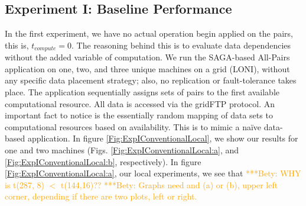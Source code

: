 \documentclass{rspublic}
\newcommand{\betynote}[1]{ {\textcolor{orange} { ***Bety: #1 }}}
\begin{document}
\subsection{Experiment I: Baseline Performance}
 In the first experiment, we have no actual operation begin applied on
the pairs, this is, $t_{compute}=0$. The reasoning behind this is to
evaluate data dependencies without the added variable of computation.
We run the SAGA-based All-Pairs application on one, two, and three
unique machines on a grid (LONI), without any specific data placement
strategy; also, no replication or fault-tolerance takes place. The
application sequentially assigns sets of pairs to the first available
computational resource. All data is accessed via the gridFTP protocol.
An important fact to notice is the essentially random mapping of data
sets to computational resources based on availability. This is to mimic
a naïve data-based application. In figure
\ref{Fig:ExpIConventionalLocal}, we show our results for one and two
machines (Figs. \ref{Fig:ExpIConventionalLocal:a}, and
\ref{Fig:ExpIConventionalLocal:b}, respectively). In figure
\ref{Fig:ExpIConventionalLocal:a}, our local experiments, we see that
\betynote{WHY is t(287, 8) $<$ t(144,16)??} \betynote{Graphs need and
(a) or (b), upper left corner, depending if there are two plots, left or
right.} 
\end{document}
